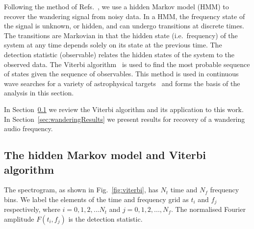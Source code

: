 \documentclass[paper-main.tex]{subfiles}
\begin{document}
Following the method of Refs.~\cite{SuvorovaEtAl:2016,SuvorovaEtAl:2017}, we use a hidden Markov model (HMM) to recover the wandering signal from noisy data. 
In a HMM, the frequency state of the signal is unknown, or hidden, and can undergo transitions at discrete times. 
The transitions are Markovian in that the hidden state (i.e.\ frequency) of the system at any time depends solely on its state at the previous time. The detection statistic (observable) relates the hidden states of the system to the observed data.
The Viterbi algorithm~\cite{Viterbi:1967} is used to find the most probable sequence of states given the sequence of observables.
This method is used in continuous wave searches for a variety of astrophysical targets~\cite{ScoX1O2Viterbi:2019, ScoX1ViterbiO1:2017, MillhouseStrangMelatos:2020, JonesSun:2020, MiddletonEtAlO2LMXBs:2020, PostMergerRemnantSearch:2019, SunEtAlSNR:2018, viterbi_application} and forms the basis of the analysis in this section. 
 

In Section~\ref{sec:viterbi} we review the Viterbi algorithm and its application to this work. 
In Section~\ref{sec:wanderingResults} we present results for recovery of a wandering audio frequency. 






\subsection{The hidden Markov model and Viterbi algorithm}
\label{sec:viterbi}



The spectrogram, as shown in Fig.~\ref{fig:viterbi}, has $N_t$ time and $N_f$ frequency bins. 
We label the elements of the time and frequency  grid as $t_i$ and $f_j$ respectively, where $i=0,1,2,...N_t$ and $j=0,1,2,...,N_f$. 
The normalised Fourier amplitude $F(t_i,f_j)$ is the detection statistic. 
\end{document}
